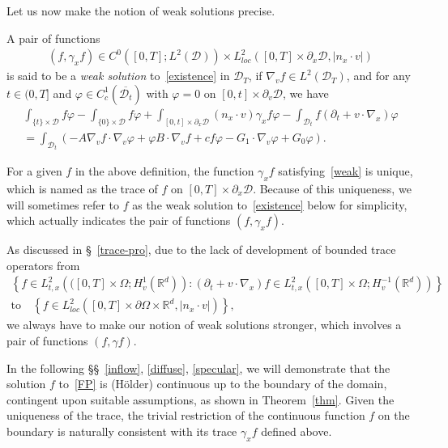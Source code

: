 \documentclass[AHL,Unicode,longabstracts,published]{cedram}
\newcommand*\p{\partial}
\newcommand*\R {\mathbb{R}}
\newcommand*\D {\mathcal{D}}
\begin{document}
Let us now make the notion of weak solutions precise.

\begin{defi}\label{def-weak}
A pair of functions
\begin{align*}
(f,\gamma_xf)\in C^0\left([0,T];L^2(\D)\right)\times L_{loc}^2\left([0,T]\times\p_x\D,|n_x\cdot v|\right)
\end{align*}
is said to be a \emph{weak solution} to~\eqref{existence} in $\D_T$, if $\nabla_vf\in L^2(\D_T)$, and for any $t\in(0,T]$ and $\varphi\in C^1_c(\overline{\D_t})$ with $\varphi=0$ on $[0,t]\times\p_v\D$, we have
\begin{multline}\label{weak}
\int_{\{t\}\times\D} f\varphi -\int_{\{0\}\times\D}f\varphi + \int_{[0,t]\times\p_x\D} (n_x\cdot v)\gamma_xf\varphi -\int_{\D_t} f\left(\p_t+v\cdot\nabla_x\right)\varphi \\
=\int_{\D_t} \left(-A\nabla_vf\cdot\nabla_v\varphi + \varphi B\cdot\nabla_vf + c f\varphi -G_1\cdot\nabla_v\varphi +G_0\varphi\right).
\end{multline}
\end{defi}

\begin{rema}
For a given $f$ in the above definition, the function $\gamma_xf$ satisfying~\eqref{weak} is unique, which is named as the trace of $f$ on $[0,T]\times\p_x\D$. Because of this uniqueness, we will sometimes refer to $f$ as the weak solution to~\eqref{existence} below for simplicity, which actually indicates the pair of functions $(f,\gamma_xf)$.
\end{rema}

\begin{rema}
As discussed in \S~\ref{trace-pro}, due to the lack of development of bounded trace operators from
\begin{multline*}
\left\{f\in L_{t,x}^2\left(([0,T]\times\Omega;H_v^1\left(\R^d\right)\right):(\p_t+v\cdot\nabla_x)f\in L_{t,x}^2\left([0,T]\times\Omega;H_v^{-1}\left(\R^d\right)\right)\right\}\\
\text{to}\quad\left\{f\in L_{loc}^2\left([0,T]\times\p\Omega\times\R^d,|n_x\cdot v|\right)\right\},
\end{multline*}
we always have to make our notion of weak solutions stronger, which involves a pair of functions $(f,\gamma f)$.
\end{rema}

\begin{rema}
In the following \S\S~\ref{inflow}, \ref{diffuse}, \ref{specular}, we will demonstrate that the solution $f$ to~\eqref{FP} is (H\"older) continuous up to the boundary of the domain, contingent upon suitable assumptions, as shown in Theorem~\ref{thm}. Given the uniqueness of the trace, the trivial restriction of the continuous function $f$ on the boundary is naturally consistent with its trace $\gamma_x f$ defined above.
\end{rema}
\end{document}

